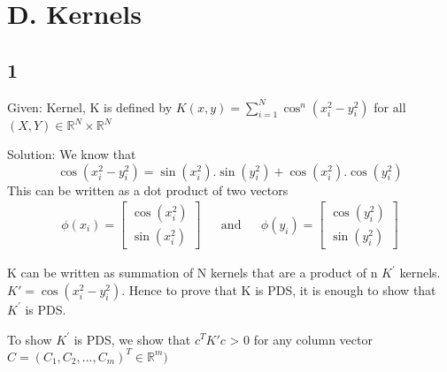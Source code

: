 \documentclass{article}
\begin{document}
\section*{D. Kernels}
\subsection*{1}
\begin{description}
  \item{Given:} Kernel, K is defined by \(K(x,y) = \sum_{i=1}^{N} \cos^{n} (x_{i}^{2} - y_{i}^{2} )\) for all \((X, Y) \in \mathbb{R}^{N} \times \mathbb{R}^{N} \) 
  \item{Solution:}  We know that
    \begin{equation}
      \cos (x_{i}^{2} - y_{i}^{2}) = \sin (x_{i}^{2}).\sin (y_{i}^{2}) + \cos (x_{i}^{2}).\cos (y_{i}^{2})
    \end{equation}
    This can be written as a dot product of two vectors 
    \begin{align}
    \phi(x_{i}) = \begin{bmatrix} \cos (x_{i}^{2}) \\ \sin (x_{i}^{2}) \end{bmatrix} && \mathrm{and} &&
    \phi(y_{i}) = \begin{bmatrix} \cos (y_{i}^{2}) \\ \sin (y_{i}^{2}) \end{bmatrix}
    \end{align}

    K can be written as summation of N kernels that are a product of n \( K^{'} \) kernels.  \( K' = \cos (x_{i}^{2} - y_{i}^{2} ) \).  Hence to prove that K is PDS, it is enough to show that \( K^{'} \) is PDS. 

    To show \( K^{'}\) is PDS, we show that \( c^{T}K'c \)  > 0 for any column vector \( C = (C_{1}, C_{2}, ...  ,C_{m})^{T} \in \mathbb{R}^{m} ) \)


\end{description}
\end{document}
